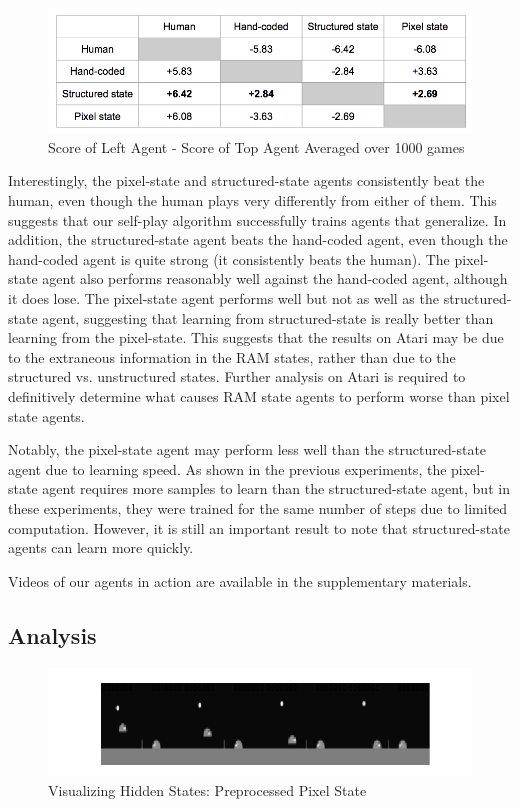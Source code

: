\documentclass[10pt,twocolumn,letterpaper]{article}
\begin{document}
\begin{figure}[H]
\center
\includegraphics[width=\columnwidth]{results}
\caption{
Score of Left Agent - Score of Top Agent Averaged over 1000 games
}\label{fig:results}
\end{figure}

Interestingly, the pixel-state and structured-state agents consistently beat the
human, even though the human plays very differently from either of them. This
suggests that our self-play algorithm successfully trains agents that
generalize. In addition, the structured-state agent beats the hand-coded
agent, even though the hand-coded agent is quite strong (it consistently beats
the human). The pixel-state agent also performs reasonably well against the
hand-coded agent, although it does lose. The pixel-state agent performs well
but not as well as the structured-state agent, suggesting that learning from
structured-state is really better than learning from the pixel-state. This
suggests that the results on Atari may be due to the extraneous information in
the RAM states, rather than due to the structured vs. unstructured states.
Further analysis on Atari is required to definitively determine what causes
RAM state agents to perform worse than pixel state agents.

Notably, the pixel-state agent may perform less well than the structured-state
agent due to learning speed. As shown in the previous experiments, the
pixel-state agent requires more samples to learn than the structured-state
agent, but in these experiments, they were trained for the same number of
steps due to limited computation. However, it is still an important result to
note that structured-state agents can learn more quickly.

Videos of our agents in action are available in the supplementary materials.

\subsection{Analysis}

\begin{figure}[H]
\center
\includegraphics[width=\columnwidth]{preprocess}
\caption{
Visualizing Hidden States: Preprocessed Pixel State
}\label{fig:preprocess}
\end{figure}
\end{document}
